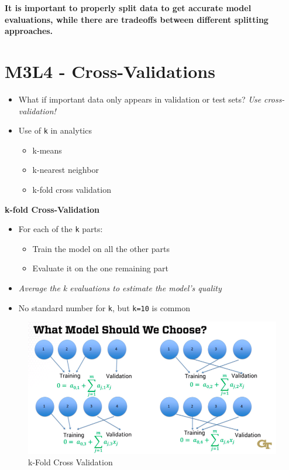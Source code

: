 \documentclass[
]{book}
\providecommand{\tightlist}{%
  \setlength{\itemsep}{0pt}\setlength{\parskip}{0pt}}
\begin{document}
\textbf{It is important to properly split data to get accurate model evaluations, while there are tradeoffs between different splitting approaches.}

\section{M3L4 - Cross-Validations}\label{m3l4---cross-validations}

\begin{itemize}
\item
  What if important data only appears in validation or test sets? \emph{Use cross-validation!}
\item
  Use of \texttt{k} in analytics

  \begin{itemize}
  \tightlist
  \item
    k-means
  \item
    k-nearest neighbor
  \item
    k-fold cross validation
  \end{itemize}
\end{itemize}

\textbf{k-fold Cross-Validation}

\begin{itemize}
\tightlist
\item
  For each of the \texttt{k} parts:

  \begin{itemize}
  \tightlist
  \item
    Train the model on all the other parts
  \item
    Evaluate it on the one remaining part
  \end{itemize}
\item
  \emph{Average the k evaluations to estimate the model's quality}
\item
  No standard number for \texttt{k}, but \texttt{k=10} is common
\end{itemize}

\begin{figure}

{\centering \includegraphics[width=1\linewidth]{figures/m3-l4-k-fold} 

}

\caption{k-Fold Cross Validation}\label{fig:unnamed-chunk-1}
\end{figure}
\end{document}
